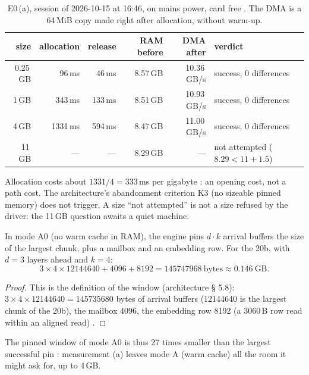 \begin{table}[ht]
\centering\small
\caption[E0\,(a): pinning 0.25 to 4\,GB]{E0\,(a), session of 2026-10-15 at 16:46, on mains power, card free \mes. The DMA is a 64\,MiB copy made right after allocation, without warm-up.}
\label{tab:t2c-epingler}
\begin{tabular}{@{}rrrrrl@{}}
\toprule
size & allocation & release & RAM before & DMA after & verdict \\
\midrule
0.25\,GB & 96\,ms & 46\,ms & 8.57\,GB & 10.36\,GB/s & success, 0 differences \\
1\,GB & 343\,ms & 133\,ms & 8.51\,GB & 10.93\,GB/s & success, 0 differences \\
4\,GB & \num{1331}\,ms & 594\,ms & 8.47\,GB & 11.00\,GB/s & success, 0 differences \\
11\,GB & — & — & 8.29\,GB & — & not attempted ($8.29 < 11 + 1.5$) \\
\bottomrule
\end{tabular}
\end{table}

Allocation costs about $\num{1331}/4 = 333$\,ms per gigabyte \calc: an opening cost, not a path cost. The architecture's abandonment criterion K3 (no sizeable pinned memory) does not trigger. A size ``not attempted'' is not a size refused by the driver: the 11\,GB question awaits a quiet machine.

\begin{proposition}\label{prop:t2c-fenetre-a0}
In mode A0 (no warm cache in RAM), the engine pins $d \cdot k$ arrival buffers the size of the largest chunk, plus a mailbox and an embedding row. For the 20b, with $d = 3$ layers ahead and $k = 4$:
\[
3 \times 4 \times \num{12144640} + \num{4096} + \num{8192} = \num{145747968}\ \text{bytes} \approx 0.146\ \text{GB}.
\]
\end{proposition}

\begin{proof}
This is the definition of the window (architecture § 5.8): $3 \times 4 \times \num{12144640} = \num{145735680}$ bytes of arrival buffers (\num{12144640} is the largest chunk of the 20b), the mailbox \num{4096}, the embedding row \num{8192} (a \num{3060}\,B row read within an aligned read) \calc.
\end{proof}

The pinned window of mode A0 is thus 27 times smaller than the largest successful pin \calc: measurement (a) leaves mode A (warm cache) all the room it might ask for, up to 4\,GB.

